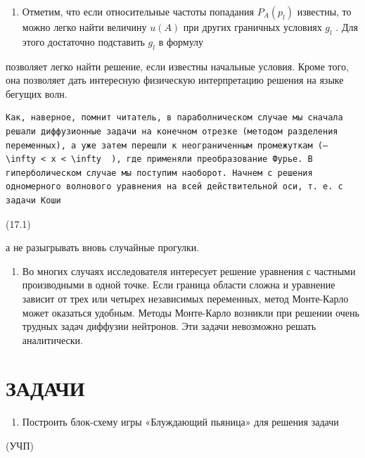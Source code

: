 \documentclass[
  ukrainian,
]{article}
\providecommand{\tightlist}{%
  \setlength{\itemsep}{0pt}\setlength{\parskip}{0pt}}
\begin{document}
\begin{enumerate}
\def\labelenumi{\arabic{enumi}.}
\tightlist
\item
  Отметим, что если относительные частоты попадания \(P_A(p_l)\)
  известны, то можно легко найти величину \(u\left(A\right)\) при других
  граничных условиях \(g_l\) . Для этого достаточно подставить \(g_l\) в
  формулу
\end{enumerate}

позволяет легко найти решение, если известны начальные условия. Кроме
того, она позволяет дать интересную физическую интерпретацию решения на
языке бегущих волн.

\begin{verbatim}
Как, наверное, помнит читатель, в параболническом случае мы сначала решали диффузионные задачи на конечном отрезке (методом разделения переменных), а уже затем перешли к неограниченным промежуткам (—   \infty < x < \infty  ), где применяли преобразование Фурье. В гиперболическом случае мы поступим наоборот. Начнем с решения одномерного волнового уравнения на всей действительной оси, т. е. с задачи Коши
\end{verbatim}

(17.1)

а не разыгрывать вновь случайные прогулки.

\begin{enumerate}
\def\labelenumi{\arabic{enumi}.}
\setcounter{enumi}{1}
\tightlist
\item
  Во многих случаях исследователя интересует решение уравнения с
  частными производными в одной точке. Если граница области сложна и
  уравнение зависит от трех или четырех независимых переменных, метод
  Монте-Карло может оказаться удобным. Методы Монте-Карло возникли при
  решении очень трудных задач диффузии нейтронов. Эти задачи невозможно
  решать аналитически.
\end{enumerate}

\section{ЗАДАЧИ}\label{ux437ux430ux434ux430ux447ux438}

\begin{enumerate}
\def\labelenumi{\arabic{enumi}.}
\tightlist
\item
  Построить блок-схему игры «Блуждающий пьяница» для решения задачи
\end{enumerate}

(УЧП)
\end{document}
